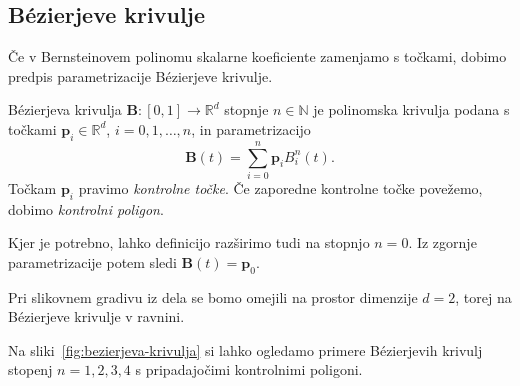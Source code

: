 \documentclass[isrm2, tisk]{fmfdelo}
\newcommand{\R}{\mathbb R}
\newcommand{\N}{\mathbb N}
\newcommand{\p}{\mathbf{p}}
\newcommand{\lilb}[2]{B_{#1}^{#2}(t)}
\newcommand{\bernsteinsump}[2]{\sum_{#1=0}^{#2} \p_{#1}\lilb{#1}{#2}}
\begin{document}
    \subsection{Bézierjeve krivulje}
    Če v Bernsteinovem polinomu skalarne koeficiente zamenjamo s točkami, dobimo predpis parametrizacije Bézierjeve krivulje.
    \begin{definicija}
        Bézierjeva krivulja $\mathbf{B}: [0,1]\to \R^d$ stopnje $n\in\N$ je polinomska krivulja podana s točkami $\p_i\in\R^d$,  $i=0,1,\ldots,n$, in parametrizacijo
        \[\mathbf{B}(t)=\bernsteinsump{i}{n}.\]
        Točkam $\p_i$ pravimo \textit{kontrolne točke}.
        Če zaporedne kontrolne točke povežemo, dobimo \textit{kontrolni poligon}.
    \end{definicija}
    \begin{opomba}
        \label{opomba:dim-0}
        Kjer je potrebno, lahko definicijo razširimo tudi na stopnjo $n=0$.
        Iz zgornje parametrizacije potem sledi $\mathbf{B}(t)=\p_0$.
    \end{opomba}
    \begin{opomba}
        Pri slikovnem gradivu iz dela se bomo omejili na prostor dimenzije $d=2$, torej na Bézierjeve krivulje v ravnini.
    \end{opomba}
    \noindent Na sliki~\ref{fig:bezierjeva-krivulja} si lahko ogledamo primere Bézierjevih krivulj stopenj $n=1,2,3,4$ s pripadajočimi kontrolnimi poligoni.
\end{document}
